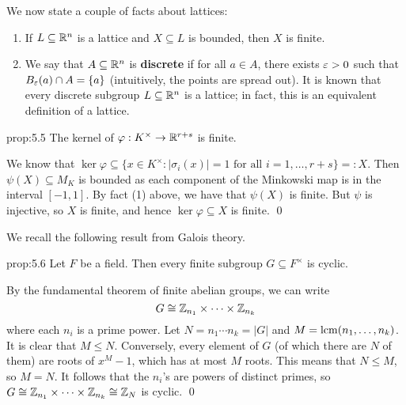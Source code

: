 We now state a couple of facts about lattices: 
\begin{enumerate}[(1)]
    \item If $L \subseteq \mathbb{R}^n$ is a lattice and $X \subseteq L$ is bounded, then 
    $X$ is finite. 
    \item We say that $A \subseteq \mathbb{R}^n$ is {\bf discrete} if for all $a \in A$, 
    there exists $\varepsilon > 0$ such that $B_\varepsilon(a) \cap A = \{a\}$ (intuitively, 
    the points are spread out). It is known 
    that every discrete subgroup $L \subseteq \mathbb{R}^n$ is a lattice; 
    in fact, this is an equivalent definition of a lattice.
\end{enumerate}

\begin{prop}{prop:5.5}
    The kernel of $\varphi : K^\times \to \mathbb{R}^{r+s}$ is finite. 
\end{prop}\vspace{-0.25cm}
\begin{pf}
    We know that $\ker\varphi \subseteq \{x \in K^\times : |\sigma_i(x)| = 1 
    \text{ for all } i = 1, \dots, r+s\} =: X$. Then $\psi(X) \subseteq M_K$ 
    is bounded as each component of the Minkowski map is in the interval $[-1, 1]$. 
    By fact (1) above, we have that $\psi(X)$ is finite. But $\psi$ is injective, 
    so $X$ is finite, and hence $\ker\varphi \subseteq X$ is finite. \qed  
\end{pf}\vspace{-0.25cm}

We recall the following result from Galois theory. 

\begin{prop}{prop:5.6}
    Let $F$ be a field. Then every finite subgroup $G \subseteq F^\times$ is cyclic.
\end{prop}\vspace{-0.25cm}
\begin{pf}
    By the fundamental theorem of finite abelian groups, we can write 
    \[ G \cong \mathbb{Z}_{n_1} \times \cdots \times \mathbb{Z}_{n_k} \] 
    where each $n_i$ is a prime power. Let $N = n_1 \cdots n_k = |G|$ and 
    $M = \operatorname{lcm}(n_1, \dots, n_k)$. It is clear that $M \leq N$. Conversely, every element 
    of $G$ (of which there are $N$ of them) are roots of $x^M - 1$, which has at most 
    $M$ roots. This means that $N \leq M$, so $M = N$. It follows that the $n_i$'s 
    are powers of distinct primes, so $G \cong \mathbb{Z}_{n_1} \times \cdots \times \mathbb{Z}_{n_k} 
    \cong \mathbb{Z}_N$ is cyclic. \qed 
\end{pf}\vspace{-0.25cm}

